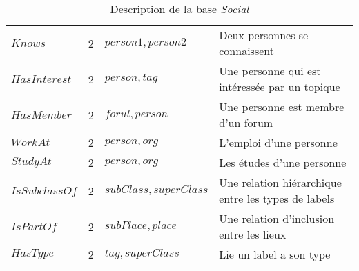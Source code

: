 \begin{table}[H]
\begin{adjustbox}{max width=\linewidth}
\begin{tabular}{l|c|l|l}
            $Knows$        & 2     & $person1, person2$       & Deux personnes se connaissent                            \\
            $HasInterest$  & 2     & $person, tag$            & Une personne qui est intéressée par un topique           \\
            $HasMember$    & 2     & $forul, person$          & Une personne est membre d'un forum                       \\
            $WorkAt$       & 2     & $person, org$            & L'emploi d'une personne                                  \\
            $StudyAt$      & 2     & $person, org$            & Les études d'une personne                                \\
            $IsSubclassOf$ & 2     & $subClass, superClass$   & Une relation hiérarchique entre les types de labels      \\
            $IsPartOf$     & 2     & $subPlace, place$        & Une relation d'inclusion entre les lieux                 \\
            $HasType$      & 2     & $tag, superClass$        & Lie un label a son type                                  \\
        \end{tabular}
    \end{adjustbox}
    \caption{Description de la base \emph{Social}}
\end{table}


